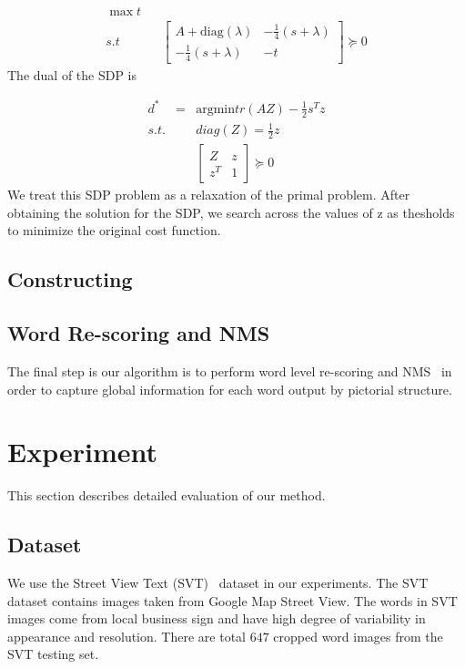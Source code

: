 \documentclass[10pt,twocolumn,letterpaper]{article}
\begin{document}
\begin{eqnarray*}
\max t\\
s.t &  & \left[\begin{array}{cc}
A+\mbox{diag}(\lambda) & -\frac{1}{4}(s+\lambda)\\
-\frac{1}{4}(s+\lambda) & -t
\end{array}\right]\succeq0
\end{eqnarray*}
The dual of the SDP is

\begin{eqnarray*}
d^{*} & = & \mbox{argmin} tr(AZ)-\frac{1}{2}s^{T}z\\
s.t. &  & diag(Z)=\frac{1}{2}z\\
 &  & \left[\begin{array}{cc}
Z & z\\
z^{T} & 1
\end{array}\right]\succeq0
\end{eqnarray*}
We treat this SDP problem as a relaxation of the primal problem. After obtaining the solution for the SDP, we search across the values of z as thesholds to minimize the original cost function.
\subsection{Constructing}
\subsection{Word Re-scoring and NMS}

The final step is our algorithm is to perform word level re-scoring and NMS~\cite{417} in order to capture global information for each word output by pictorial structure.

\section{Experiment}

This section describes detailed evaluation of our method.

\subsection{Dataset}

We use the Street View Text (SVT)~\cite{417} dataset in our experiments. The SVT dataset contains images taken from Google Map Street View. The words in SVT images come from local business sign and have high degree of variability in appearance and resolution. There are total $647$ cropped word images from the SVT testing set.
\end{document}
